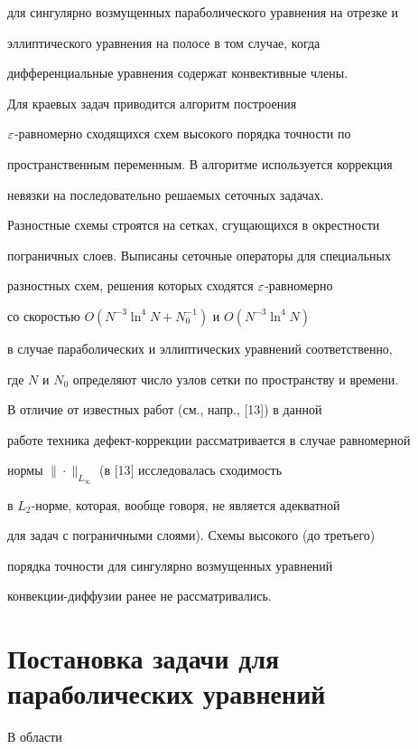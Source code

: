 для сингулярно возмущенных параболического уравнения на отрезке и


эллиптического уравнения на полосе в том случае, когда


дифференциальные уравнения содержат конвективные члены.


Для краевых задач приводится алгоритм построения


$\varepsilon$-равномерно сходящихся схем высокого порядка точности по


пространственным переменным. В алгоритме используется коррекция


невязки на последовательно решаемых сеточных задачах.


Разностные схемы строятся на сетках, сгущающихся в окрестности


пограничных слоев. Выписаны сеточные операторы для специальных


разностных схем, решения которых сходятся $\varepsilon$-равномерно


со скоростью $O(N^{-3}\ln^4 N+N_0^{-1})$ и $O(N^{-3}\ln^4 N)$


в случае параболических и эллиптических уравнений соответственно,


где $N$ и $N_0$ определяют число узлов сетки по пространству и времени.





В отличие от известных работ (см., напр., [13]) в данной


работе техника дефект-коррекции рассматривается в случае равномерной


нормы $\|\cdot\|_{L_{\infty}}$ (в [13] исследовалась сходимость


в $L_2$-норме, которая, вообще говоря, не является адекватной


для задач с пограничными слоями). Схемы высокого (до третьего)


порядка точности для сингулярно возмущенных уравнений


конвекции-диффузии ранее не рассматривались.





\section{Постановка задачи для параболических уравнений}





В области


